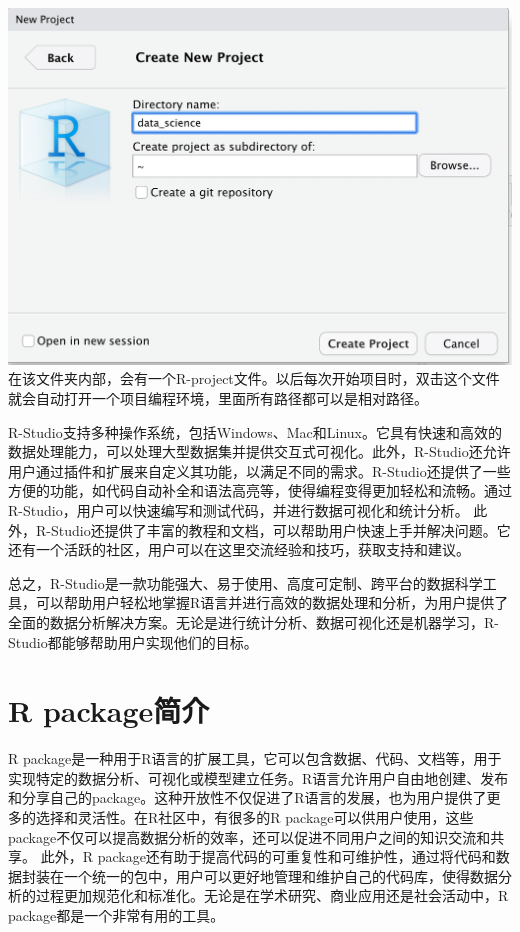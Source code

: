 \documentclass[]{book}
\begin{document}
\includegraphics{images/2.12.png}
在该文件夹内部，会有一个R-project文件。以后每次开始项目时，双击这个文件就会自动打开一个项目编程环境，里面所有路径都可以是相对路径。

R-Studio支持多种操作系统，包括Windows、Mac和Linux。它具有快速和高效的数据处理能力，可以处理大型数据集并提供交互式可视化。此外，R-Studio还允许用户通过插件和扩展来自定义其功能，以满足不同的需求。R-Studio还提供了一些方便的功能，如代码自动补全和语法高亮等，使得编程变得更加轻松和流畅。通过R-Studio，用户可以快速编写和测试代码，并进行数据可视化和统计分析。
此外，R-Studio还提供了丰富的教程和文档，可以帮助用户快速上手并解决问题。它还有一个活跃的社区，用户可以在这里交流经验和技巧，获取支持和建议。

总之，R-Studio是一款功能强大、易于使用、高度可定制、跨平台的数据科学工具，可以帮助用户轻松地掌握R语言并进行高效的数据处理和分析，为用户提供了全面的数据分析解决方案。无论是进行统计分析、数据可视化还是机器学习，R-Studio都能够帮助用户实现他们的目标。

\hypertarget{r-packageux7b80ux4ecb}{%
\section{R package简介}\label{r-packageux7b80ux4ecb}}

R package是一种用于R语言的扩展工具，它可以包含数据、代码、文档等，用于实现特定的数据分析、可视化或模型建立任务。R语言允许用户自由地创建、发布和分享自己的package。这种开放性不仅促进了R语言的发展，也为用户提供了更多的选择和灵活性。在R社区中，有很多的R package可以供用户使用，这些package不仅可以提高数据分析的效率，还可以促进不同用户之间的知识交流和共享。
此外，R package还有助于提高代码的可重复性和可维护性，通过将代码和数据封装在一个统一的包中，用户可以更好地管理和维护自己的代码库，使得数据分析的过程更加规范化和标准化。无论是在学术研究、商业应用还是社会活动中，R package都是一个非常有用的工具。
\end{document}
